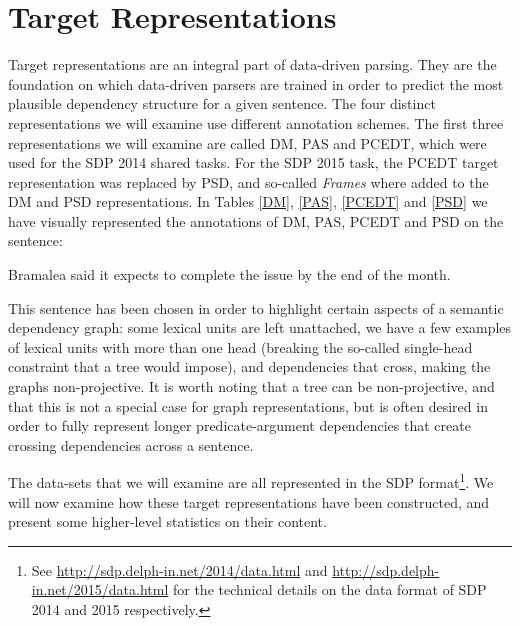 \section{Target Representations}
\label{sec:representations}

Target representations are an integral part of data-driven parsing. They are the foundation on which data-driven parsers are trained in order to predict the most plausible dependency structure for a given sentence. The four distinct representations we will examine use different annotation schemes. The first three representations we will examine are called DM, PAS and PCEDT, which were used for the SDP 2014 shared tasks. For the SDP 2015 task, the PCEDT target representation was replaced by PSD, and so-called \textit{Frames} where added to the DM and PSD representations. In Tables \ref{DM}, \ref{PAS}, \ref{PCEDT} and \ref{PSD} we have visually represented the annotations of DM, PAS, PCEDT and PSD on the sentence:

\begin{displayquote}
Bramalea said it expects to complete the issue by the end of the month.
\end{displayquote}

This sentence has been chosen in order to highlight certain aspects of a semantic dependency graph: some lexical units are left unattached, we have a few examples of lexical units with more than one head (breaking the so-called single-head constraint that a tree would impose), and dependencies that cross, making the graphs non-projective. It is worth noting that a tree can be non-projective, and that this is not a special case for graph representations, but is often desired in order to fully represent longer predicate-argument dependencies that create crossing dependencies across a sentence.

The data-sets that we will examine are all represented in the SDP format\footnote{See \url{http://sdp.delph-in.net/2014/data.html} and \url{http://sdp.delph-in.net/2015/data.html} for the technical details on the data format of SDP 2014 and 2015 respectively.}. We will now examine how these target representations have been constructed, and present some higher-level statistics on their content.


